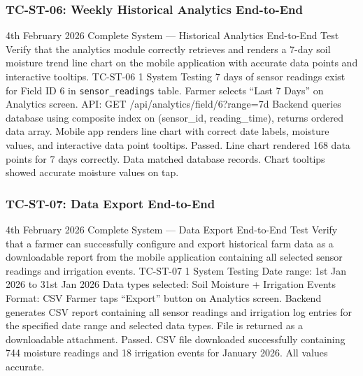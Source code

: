 \subsubsection{TC-ST-06: Weekly Historical Analytics End-to-End}

\testcase%
{4th February 2026}%
{Complete System --- Historical Analytics End-to-End Test}%
{Verify that the analytics module correctly retrieves and
renders a 7-day soil moisture trend line chart on the
mobile application with accurate data points and
interactive tooltips.}%
{TC-ST-06}%
{1}%
{System Testing}%
{7 days of sensor readings exist for Field ID 6 in
\texttt{sensor\_readings} table. \newline
Farmer selects ``Last 7 Days'' on Analytics screen. \newline
API: GET /api/analytics/field/6?range=7d}%
{Backend queries database using composite index on
(sensor\_id, reading\_time), returns ordered data array.
Mobile app renders line chart with correct date labels,
moisture values, and interactive data point tooltips.}%
{Passed. Line chart rendered 168 data points for 7 days
correctly. Data matched database records. Chart tooltips
showed accurate moisture values on tap.}

\subsubsection{TC-ST-07: Data Export End-to-End}

\testcase%
{4th February 2026}%
{Complete System --- Data Export End-to-End Test}%
{Verify that a farmer can successfully configure and
export historical farm data as a downloadable report
from the mobile application containing all selected
sensor readings and irrigation events.}%
{TC-ST-07}%
{1}%
{System Testing}%
{Date range: 1st Jan 2026 to 31st Jan 2026 \newline
Data types selected: Soil Moisture + Irrigation Events
\newline
Format: CSV \newline
Farmer taps ``Export'' button on Analytics screen.}%
{Backend generates CSV report containing all sensor
readings and irrigation log entries for the specified
date range and selected data types. File is returned as
a downloadable attachment.}%
{Passed. CSV file downloaded successfully containing 744
moisture readings and 18 irrigation events for January
2026. All values accurate.}

